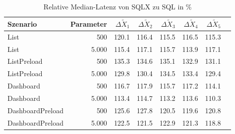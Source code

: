 
\begin{table}[ht]
\setlength{\extrarowheight}{-1pt}
\centering
\caption{Relative Median-Latenz von SQLX zu SQL in \%}
\begin{tabular}{lrrrrrrr}
\toprule
Szenario & Parameter & ${\Delta \tilde{X}_1}$ & ${\Delta \tilde{X}_2}$ & ${\Delta \tilde{X}_3}$ & ${\Delta \tilde{X}_4}$ & ${\Delta \tilde{X}_5}$ \\
\midrule
	List & 500 & \cellcolor{red!10}  120.1 & \cellcolor{red!8}  116.4 & \cellcolor{red!8}  115.5 & \cellcolor{red!8}  116.5 & \cellcolor{red!8}  115.3 \\
	List & 5.000 & \cellcolor{red!8}  115.4 & \cellcolor{red!9}  117.1 & \cellcolor{red!8}  115.7 & \cellcolor{red!7}  113.9 & \cellcolor{red!9}  117.1 \\
	ListPreload & 500 & \cellcolor{red!18}  135.3 & \cellcolor{red!17}  134.6 & \cellcolor{red!18}  135.1 & \cellcolor{red!16}  132.9 & \cellcolor{red!16}  131.1 \\
	ListPreload & 5.000 & \cellcolor{red!15}  129.8 & \cellcolor{red!15}  130.4 & \cellcolor{red!17}  134.5 & \cellcolor{red!17}  133.4 & \cellcolor{red!15}  129.4 \\
	Dashboard & 500 & \cellcolor{red!8}  116.7 & \cellcolor{red!9}  117.9 & \cellcolor{red!8}  115.7 & \cellcolor{red!9}  117.2 & \cellcolor{red!7}  114.1 \\
	Dashboard & 5.000 & \cellcolor{red!7}  113.4 & \cellcolor{red!7}  114.7 & \cellcolor{red!7}  113.2 & \cellcolor{red!7}  113.6 & \cellcolor{red!5}  110.3 \\
	DashboardPreload & 500 & \cellcolor{red!13}  125.6 & \cellcolor{red!14}  127.8 & \cellcolor{red!10}  120.5 & \cellcolor{red!10}  119.6 & \cellcolor{red!10}  120.8 \\
	DashboardPreload & 5.000 & \cellcolor{red!11}  122.5 & \cellcolor{red!11}  121.5 & \cellcolor{red!11}  122.9 & \cellcolor{red!11}  121.3 & \cellcolor{red!9}  118.8 \\
\bottomrule
\end{tabular}
\label{tab:relative_latenz_sqlx}
\end{table}
	